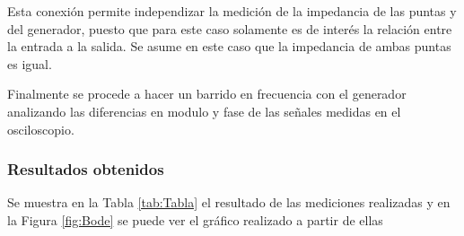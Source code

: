Esta conexi\'on permite independizar la medici\'on de la impedancia de las puntas y del generador, puesto que para este caso solamente es de inter\'es la relaci\'on entre la entrada a la salida. Se asume en este caso que la impedancia de ambas puntas es igual.

Finalmente se procede a hacer un barrido en frecuencia con el generador analizando las diferencias en modulo y fase de las se\~nales medidas en el osciloscopio.

\newpage

\subsubsection{Resultados obtenidos}
Se muestra en la Tabla \ref{tab:Tabla} el resultado de las mediciones realizadas y en la Figura 
\ref{fig:Bode} se puede ver el gr\'afico realizado a partir de ellas

